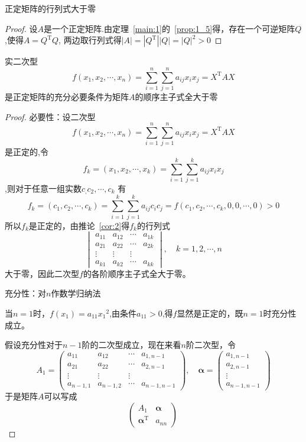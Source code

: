 \begin{corollary}\label{cor:2}
    正定矩阵的行列式大于零
\end{corollary}
\begin{proof}
    设$A$是一个正定矩阵.由定理~\ref{main:1}的~\ref{prop:1_5}得，存在一个可逆矩阵$Q$,使得$A=Q^\mathrm{T}Q$,
    两边取行列式得$|A|=|Q^\mathrm{T}||Q|=|Q|^2>0$
\end{proof}
\begin{theorem}%
    实二次型
    $$f(x_1,x_2,\cdots,x_n)=\sum_{i=1}^{n} \sum_{j=1}^{n} a_{ij}x_ix_j=X^\mathrm{T}AX$$
    是正定矩阵的充分必要条件为矩阵$A$的顺序主子式全大于零
\end{theorem}
\begin{proof}
    必要性：设二次型$$f(x_1,x_2,\cdots,x_n)=\sum_{i=1}^{n} \sum_{j=1}^{n} a_{ij}x_ix_j=X^\mathrm{T}AX$$是正定的,令
    $$f_k=(x_1,x_2,\cdots,x_k)=\sum_{i=1}^{k} \sum_{j=1}^{k} a_{ij}x_ix_j$$,则对于任意一组实数$c_,c_2,\cdots,c_k$
    有$$f_k=(c_1,c_2,\cdots,c_k)=\sum_{i=1}^{k} \sum_{j=1}^{k} a_{ij}c_ic_j=f(c_1,c_2,\cdots,c_k,0,0,\cdots,0)>0$$
    所以$f_k$是正定的，由推论~\ref{cor:2}得$f_k$的行列式\[
    \begin{vmatrix}
        a_{11} & a_{12} & \cdots & a_{1k}\\
        a_{21} & a_{22} & \cdots & a_{2k}\\
        \vdots & \vdots &          \vdots\\
        a_{k1} & a_{k2} & \cdots & a_{kk}
    \end{vmatrix},\quad k=1,2,\cdots,n
    \]大于零，因此二次型$f$的各阶顺序主子式全大于零。

    充分性：对$n$作数学归纳法

    当$n=1$时，$f(x_1)=a_{11}{x_1}^2$,由条件$a_{11}>0$,得$f$显然是正定的，既$n=1$时充分性成立。

    假设充分性对于$n-1$阶的二次型成立，现在来看$n$阶二次型，令
    \[A_1=
    \begin{pmatrix}
        a_{11} & a_{12} & \cdots & a_{1,n-1}\\
        a_{21} & a_{22} & \cdots & a_{2,n-1}\\
        \vdots & \vdots &          \vdots\\
        a_{n-1,1} & a_{n-1,2} & \cdots & a_{n-1,n-1}
    \end{pmatrix},\quad \boldsymbol{\alpha}=
    \begin{pmatrix}
        a_{1,n-1}\\
        a_{2,n-1}\\
        \vdots\\
        a_{n-1,n-1}
    \end{pmatrix}
    \]
    于是矩阵$A$可以写成
    \[
    \begin{pmatrix}
        A_1 & \boldsymbol{\alpha}\\
        \boldsymbol{\alpha}^\mathrm{T} & a_{nn}
    \end{pmatrix}\
    \]


\end{proof}
